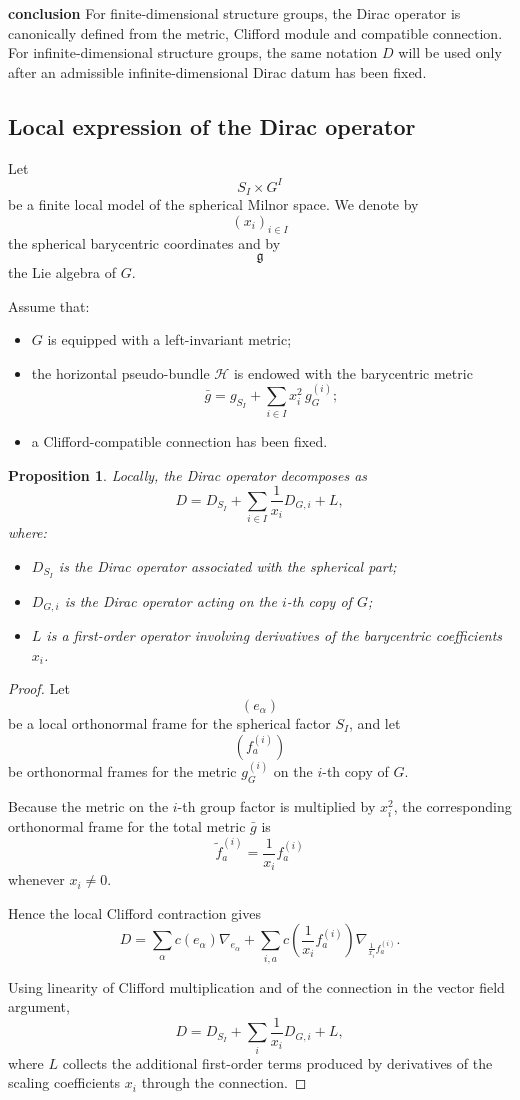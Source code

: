 \documentclass[11pt]{amsart}
\newtheorem{proposition}[theorem]{Proposition}
\begin{document}
\textbf{conclusion}
For finite-dimensional structure groups, the Dirac operator is canonically
defined from the metric, Clifford module and compatible connection. For
infinite-dimensional structure groups, the same notation \(D\) will be used
only after an admissible infinite-dimensional Dirac datum has been fixed.


\subsection{Local expression of the Dirac operator}

Let
\[
S_I\times G^I
\]
be a finite local model of the spherical Milnor space. We denote by
\[
(x_i)_{i\in I}
\]
the spherical barycentric coordinates and by
\[
\mathfrak g
\]
the Lie algebra of \(G\).

Assume that:
\begin{itemize}
\item \(G\) is equipped with a left-invariant metric;
\item the horizontal pseudo-bundle \(\mathcal H\) is endowed with the
barycentric metric
\[
\bar g
=
g_{S_I}
+
\sum_{i\in I} x_i^2\, g_G^{(i)};
\]
\item a Clifford-compatible connection has been fixed.
\end{itemize}

\begin{proposition}
Locally, the Dirac operator decomposes as
\[
D
=
D_{S_I}
+
\sum_{i\in I}\frac{1}{x_i}D_{G,i}
+
L,
\]
where:
\begin{itemize}
\item \(D_{S_I}\) is the Dirac operator associated with the spherical part;
\item \(D_{G,i}\) is the Dirac operator acting on the \(i\)-th copy of \(G\);
\item \(L\) is a first-order operator involving derivatives of the barycentric
coefficients \(x_i\).
\end{itemize}
\end{proposition}

\begin{proof}
Let
\[
(e_\alpha)
\]
be a local orthonormal frame for the spherical factor \(S_I\), and let
\[
(f_a^{(i)})
\]
be orthonormal frames for the metric \(g_G^{(i)}\) on the \(i\)-th copy of
\(G\).

Because the metric on the \(i\)-th group factor is multiplied by \(x_i^2\),
the corresponding orthonormal frame for the total metric \(\bar g\) is
\[
\widetilde f_a^{(i)}
=
\frac{1}{x_i}f_a^{(i)}
\]
whenever \(x_i\neq0\).

Hence the local Clifford contraction gives
\[
D
=
\sum_\alpha c(e_\alpha)\nabla_{e_\alpha}
+
\sum_{i,a}
c\!\left(\frac1{x_i}f_a^{(i)}\right)
\nabla_{\frac1{x_i}f_a^{(i)}}.
\]

Using linearity of Clifford multiplication and of the connection in the vector
field argument,
\[
D
=
D_{S_I}
+
\sum_i \frac1{x_i}D_{G,i}
+
L,
\]
where \(L\) collects the additional first-order terms produced by derivatives
of the scaling coefficients \(x_i\) through the connection.
\end{proof}
\end{document}
